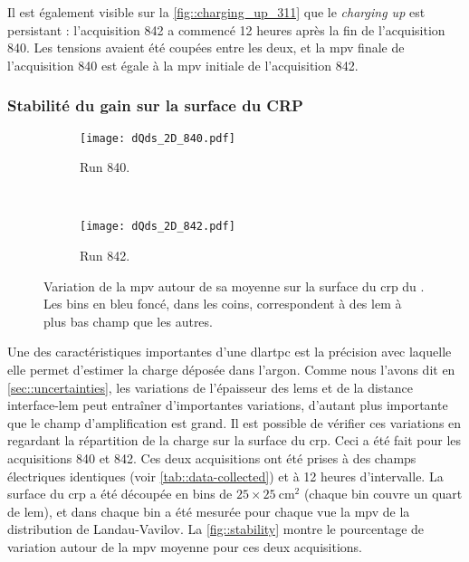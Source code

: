        Il est également visible sur la \autoref{fig::charging_up_311} que le \textit{charging up} est persistant : l'acquisition 842 a commencé 12 heures après la fin de l'acquisition 840. Les tensions avaient été coupées entre les deux, et la \gls{mpv} finale de l'acquisition 840 est égale à la \gls{mpv} initiale de l'acquisition 842.


      \subsubsection{Stabilité du gain sur la surface du CRP}

        \begin{figure}[htbp]
          \centering
          \begin{subfigure}[t]{0.9\textwidth}
            \centering
            \texttt{[image: dQds\_2D\_840.pdf]}
            \caption{Run 840.}
          \end{subfigure}\\
          \begin{subfigure}[t]{0.9\textwidth}
            \centering
            \texttt{[image: dQds\_2D\_842.pdf]}
            \caption{Run 842.}
          \end{subfigure}
          \caption[Variation de la MPV sur la surface du CRP dans le \TOO{}]{\label{fig::stability}Variation de la \gls{mpv} autour de sa moyenne sur la surface du \gls{crp} du \TOO{}. Les bins en bleu foncé, dans les coins, correspondent à des \gls{lem} à plus bas champ que les autres.}
        \end{figure}

        Une des caractéristiques importantes d'une \gls{dlartpc} est la précision avec laquelle elle permet d'estimer la charge déposée dans l'argon. Comme nous l'avons dit en \autoref{sec::uncertainties}, les variations de l'épaisseur des \glspl{lem} et de la distance interface-\gls{lem} peut entraîner d'importantes variations, d'autant plus importante que le champ d'amplification est grand. Il est possible de vérifier ces variations en regardant la répartition de la charge sur la surface du \gls{crp}. Ceci a été fait pour les acquisitions 840 et 842. Ces deux acquisitions ont été prises à des champs électriques identiques (voir \autoref{tab::data-collected}) et à 12 heures d'intervalle. La surface du \gls{crp} a été découpée en bins de $25\times\SI{25}{\centi\meter\squared}$ (chaque bin couvre un quart de \gls{lem}), et dans chaque bin a été mesurée pour chaque vue la \gls{mpv} de la distribution de Landau-Vavilov. La \autoref{fig::stability} montre le pourcentage de variation autour de la \gls{mpv} moyenne pour ces deux acquisitions. 

